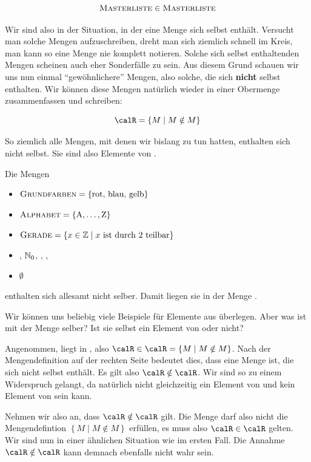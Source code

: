 \documentclass[../../main.tex]{subfiles}
\begin{document}
\[\textsc{Masterliste} \in \textsc{Masterliste}\]


Wir sind also in der Situation, in der eine Menge sich selbst enthält. Versucht man solche Mengen aufzuschreiben, dreht man sich ziemlich schnell im Kreis, man kann so eine Menge nie komplett notieren. Solche sich selbst enthaltenden Mengen scheinen auch eher Sonderfälle zu sein. Aus diesem Grund schauen wir uns nun einmal \enquote{gewöhnlichere} Mengen, also solche, die sich \textbf{nicht} selbst enthalten. Wir können diese Mengen natürlich wieder in einer Obermenge zusammenfassen und schreiben:

\[\calR = \left\{ M \mid M \notin M \right\}\]

So ziemlich alle Mengen, mit denen wir bislang zu tun hatten, enthalten sich nicht selbst. Sie sind also Elemente von \calR.

\begin{example}{}
	Die Mengen
	\begin{itemize}
		\item $\textsc{Grundfarben} = \left\{\text{rot, blau, gelb}\right\}$
		\item $\textsc{Alphabet} = \left\{\text{A},\ldots,\text{Z}\right\}$
		\item $\textsc{Gerade} = \left\{x \in \mathbb{Z} \mid x \text{ ist durch 2 teilbar}\right\}$
		\item \Natural, $\mathbb{N}_0$, \Integer, \Rational, \Real
		\item $\emptyset$
	\end{itemize}
	enthalten sich allesamt nicht selber. Damit liegen sie in der Menge \R.
\end{example}

Wir können uns beliebig viele Beispiele für Elemente aus \calR überlegen. Aber was ist mit der Menge \calR selber? Ist sie selbst ein Element von \calR oder nicht?

Angenommen, \calR liegt in \calR, also $\calR \in \calR = \left\{ M \mid M \notin M \right\}$. Nach der Mengendefinition auf der 
rechten Seite bedeutet dies, dass \calR eine Menge ist, die sich nicht selbst enthält. Es gilt also $\calR \notin \calR$. Wir sind 
so zu einem Widerspruch gelangt, da \calR natürlich nicht gleichzeitig ein Element von \calR und kein Element von \calR sein kann.

Nehmen wir also an, dass $\calR \notin \calR$ gilt. Die Menge \calR darf also nicht die Mengendefintion $\left\{ M \mid M \notin M \right\}$ erfüllen, es muss also $\calR \in \calR$ gelten. Wir sind nun in einer ähnlichen Situation wie im ersten Fall. Die Annahme $\calR \notin \calR$ kann demnach ebenfalls nicht wahr sein.
\end{document}
